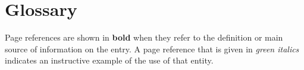 \documentclass[10pt,twoside,english,pdftex]{article}
\begin{document}

\T\markright{}%
\T\pagestyle{plain}
\T\cleardoublepage
\T{}%
\T\markright{}%
\W{}
\T\pagestyle{fancy}
\T\thispagestyle{fancybottom}
\T{}%
\T\global\def\fnlastname{ }%
\T\renewcommand{\headrulewidth}{0pt}
\section*{Glossary}




\T\markright{}%
\T\pagestyle{plain}
\T\cleardoublepage
\W{}
\T\pagestyle{fancy}
\T\thispagestyle{fancybottom}
\T\fancyhead[er,ol]{}
\T\small
\T{}%

\T\twocolumn
%
\texonly{\section*{\indexname}}%
% 
Page references are shown in \textbf{bold} when they refer to the definition
or main source of information on the entry. A page reference that is given in
\textit{\textcolor{verydarkgreen}{green italics}\/} indicates an instructive
example of the use of that entity.
%
\W\\~\\
\T\bigskip
%
\texorhtml{}{\htmlprintindex}

\end{document}
